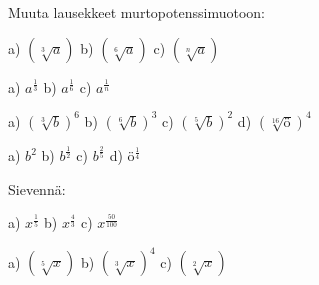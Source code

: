 Muuta lausekkeet murtopotenssimuotoon:

\begin{tehtava}
a) $(\sqrt[3]{a})$ \qquad
b) $(\sqrt[6]{a})$ \qquad
c) $(\sqrt[n]{a})$ 
\begin{vastaus}	
a) $a^\frac{1}{3}$ \qquad
b) $a^\frac{1}{6}$ \qquad
c) $a^\frac{1}{n}$ \qquad
\end{vastaus}
\end{tehtava}

\begin{tehtava}
a) $(\sqrt[3]{b})^6$ \qquad
b) $(\sqrt[6]{b})^3$ \qquad
c) $(\sqrt[5]{b})^2$ \qquad
d) $(\sqrt[16]{ö})^4$
\begin{vastaus}	
a) $b^2$ \qquad
b) $b^\frac{1}{2}$ \qquad
c) $b^\frac{2}{5}$ \qquad
d) $ö^\frac{1}{4}$
\end{vastaus}
\end{tehtava}

Sievennä:
\begin{tehtava}
a) $x^\frac{1}{5}$ \qquad
b) $x^\frac{4}{3}$ \qquad
c) $x^\frac{50}{100}$ \qquad
\begin{vastaus}	
a) $(\sqrt[5]{x})$ \qquad
b) $(\sqrt[3]{x})^4$ \qquad
c) $(\sqrt[2]{x})$ 
\end{vastaus}
\end{tehtava}